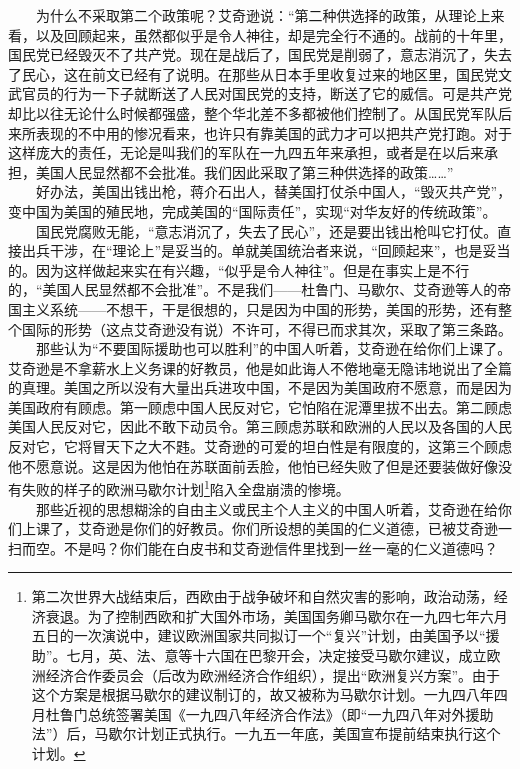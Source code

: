 \documentclass[cn,11pt,chinese]{elegantbook}
\begin{document}
　　为什么不采取第二个政策呢？艾奇逊说：“第二种供选择的政策，从理论上来看，以及回顾起来，虽然都似乎是令人神往，却是完全行不通的。战前的十年里，国民党已经毁灭不了共产党。现在是战后了，国民党是削弱了，意志消沉了，失去了民心，这在前文已经有了说明。在那些从日本手里收复过来的地区里，国民党文武官员的行为一下子就断送了人民对国民党的支持，断送了它的威信。可是共产党却比以往无论什么时候都强盛，整个华北差不多都被他们控制了。从国民党军队后来所表现的不中用的惨况看来，也许只有靠美国的武力才可以把共产党打跑。对于这样庞大的责任，无论是叫我们的军队在一九四五年来承担，或者是在以后来承担，美国人民显然都不会批准。我们因此采取了第三种供选择的政策……”\\
　　好办法，美国出钱出枪，蒋介石出人，替美国打仗杀中国人，“毁灭共产党”，变中国为美国的殖民地，完成美国的“国际责任”，实现“对华友好的传统政策”。\\
　　国民党腐败无能，“意志消沉了，失去了民心”，还是要出钱出枪叫它打仗。直接出兵干涉，在“理论上”是妥当的。单就美国统治者来说，“回顾起来”，也是妥当的。因为这样做起来实在有兴趣，“似乎是令人神往”。但是在事实上是不行的，“美国人民显然都不会批准”。不是我们——杜鲁门、马歇尔、艾奇逊等人的帝国主义系统——不想干，干是很想的，只是因为中国的形势，美国的形势，还有整个国际的形势（这点艾奇逊没有说）不许可，不得已而求其次，采取了第三条路。\\
　　那些认为“不要国际援助也可以胜利”的中国人听着，艾奇逊在给你们上课了。艾奇逊是不拿薪水上义务课的好教员，他是如此诲人不倦地毫无隐讳地说出了全篇的真理。美国之所以没有大量出兵进攻中国，不是因为美国政府不愿意，而是因为美国政府有顾虑。第一顾虑中国人民反对它，它怕陷在泥潭里拔不出去。第二顾虑美国人民反对它，因此不敢下动员令。第三顾虑苏联和欧洲的人民以及各国的人民反对它，它将冒天下之大不韪。艾奇逊的可爱的坦白性是有限度的，这第三个顾虑他不愿意说。这是因为他怕在苏联面前丢脸，他怕已经失败了但是还要装做好像没有失败的样子的欧洲马歇尔计划\footnote[5]{ 第二次世界大战结束后，西欧由于战争破坏和自然灾害的影响，政治动荡，经济衰退。为了控制西欧和扩大国外市场，美国国务卿马歇尔在一九四七年六月五日的一次演说中，建议欧洲国家共同拟订一个“复兴”计划，由美国予以“援助”。七月，英、法、意等十六国在巴黎开会，决定接受马歇尔建议，成立欧洲经济合作委员会（后改为欧洲经济合作组织），提出“欧洲复兴方案”。由于这个方案是根据马歇尔的建议制订的，故又被称为马歇尔计划。一九四八年四月杜鲁门总统签署美国《一九四八年经济合作法》（即“一九四八年对外援助法”）后，马歇尔计划正式执行。一九五一年底，美国宣布提前结束执行这个计划。}陷入全盘崩溃的惨境。\\
　　那些近视的思想糊涂的自由主义或民主个人主义的中国人听着，艾奇逊在给你们上课了，艾奇逊是你们的好教员。你们所设想的美国的仁义道德，已被艾奇逊一扫而空。不是吗？你们能在白皮书和艾奇逊信件里找到一丝一毫的仁义道德吗？\\
\end{document}
